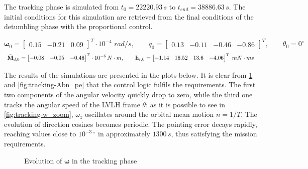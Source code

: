 The tracking phase is simulated from $t_0 = 22220.93 \, s$ to $t_{end} = 38886.63 \, s$. The initial conditions for this simulation are retrieved from the final conditions of the detumbling phase with the proportional control.

\begin{equation*}
    \bm{\omega}_0 = \begin{bmatrix}
    0.15 & -0.21 & 0.09
    \end{bmatrix}^T \cdot 10^{-4} \;
    rad/s, \qquad
    q_0 = \begin{bmatrix}
    0.13 & -0.11 & -0.46 & -0.86
    \end{bmatrix}^T, \qquad
    \theta_0 = 0^{\circ}
\end{equation*}
\begin{equation*}
    \Bar{\mathbf{M}}_{d,0} = \begin{bmatrix}
    -0.08 & -0.05 & -0.46
    \end{bmatrix}^T \cdot 10^{-6} \, N \cdot m, \qquad
    \mathbf{h}_{r,0} = \begin{bmatrix}
    -1.14 & 16.52 & 13.6 & -4.06
    \end{bmatrix}^T \; mN \cdot ms
\end{equation*}

The results of the simulations are presented in the plots below. It is clear from \cref{fig:tracking-w} and \cref{fig:tracking-Abn_pe} that the control logic fulfils the requirements. The first two components of the angular velocity quickly drop to zero, while the third one tracks the angular speed of the LVLH frame $\Dot{\theta}$: as it is possible to see in \cref{fig:tracking-w_zoom}, $\omega_z$ oscillates around the orbital mean motion $n = 1/T$. The evolution of direction cosines becomes periodic. The pointing error decays rapidly, reaching values close to $10^{-3}\,{}^{\circ}$ in approximately $1300 \, s$, thus satisfying the mission requirements.

\begin{figure}[h!]
    \centering
    \caption{Evolution of $\bm{\omega}$ in the tracking phase}
    \label{fig:tracking-w}
\end{figure}


